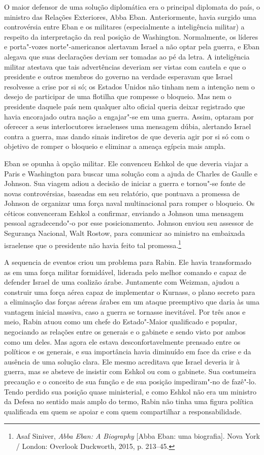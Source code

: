 O maior defensor de uma solução diplomática era o principal diplomata do
país, o ministro das Relações Exteriores, Abba Eban. Anteriormente,
havia surgido uma controvérsia entre Eban e os militares (especialmente
a inteligência militar) a respeito da interpretação da real posição de
Washington. Normalmente, os líderes e porta"-vozes norte"-americanos
alertavam Israel a não optar pela guerra, e Eban alegava que suas
declarações deviam ser tomadas ao pé da letra. A inteligência militar
atestava que tais advertências deveriam ser vistas com cautela e que o
presidente e outros membros do governo na verdade esperavam que Israel
resolvesse a crise por si só; os Estados Unidos não tinham nem a intenção nem o
desejo de participar de uma flotilha que rompesse o bloqueio. Mas nem o
presidente daquele país nem qualquer alto oficial queria deixar registrado
que havia encorajado outra nação a engajar"-se em uma guerra. Assim,
optaram por oferecer a seus interlocutores israelenses uma mensagem
dúbia, alertando Israel contra a guerra, mas dando sinais indiretos de
que deveria agir por si só com o objetivo de romper o bloqueio e
eliminar a ameaça egípcia mais ampla.

Eban se opunha à opção militar. Ele convenceu Eshkol de que deveria
viajar a Paris e Washington para buscar uma solução com a ajuda de
Charles de Gaulle e Johnson. Sua viagem adiou a decisão de iniciar a
guerra e tornou"-se fonte de novas controvérsias, baseadas em seu
relatório, que pontuava a promessa de Johnson de organizar uma força naval
multinacional para romper o bloqueio. Os céticos convenceram Eshkol a
confirmar, enviando a Johnson uma mensagem pessoal agradecendo"-o por
esse posicionamento. Johnson enviou seu assessor de Segurança Nacional,
Walt Rostow, para comunicar ao ministro na embaixada israelense que o
presidente não havia feito tal promessa.\footnote{Asaf Siniver, \emph{Abba Eban: A Biography} {[}Abba Eban: uma biografia{]}. Nova York / London: Overlook
Duckworth, 2015, p. 213--45.}

A sequencia de eventos criou um problema para Rabin. Ele havia
transformado as  em uma força militar formidável, liderada pelo
melhor comando e capaz de defender Israel de uma coalizão árabe.
Juntamente com Weizman, ajudou a construir uma força aérea capaz de
implementar o Kurnass, o plano secreto para a eliminação das forças
aéreas árabes em um ataque preemptivo que daria às  uma vantagem
inicial massiva, caso a guerra se tornasse inevitável. Por três anos e
meio, Rabin atuou como um chefe do Estado"-Maior qualificado e popular,
negociando as relações entre os generais e o gabinete e sendo visto por
ambos como um deles. Mas agora ele estava desconfortavelmente prensado
entre os políticos e os generais, e sua importância havia diminuído em
face da crise e da ausência de uma solução clara. Ele mesmo acreditava
que Israel deveria ir à guerra, mas se absteve de insistir com Eshkol ou
com o gabinete. Sua costumeira precaução e o conceito de sua função e de
sua posição impediram"-no de fazê"-lo. Tendo perdido sua posição quase
ministerial, e como Eshkol não era um ministro da Defesa no sentido mais
amplo do termo, Rabin não tinha uma figura política qualificada em quem
se apoiar e com quem compartilhar a responsabilidade.

